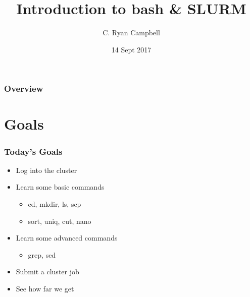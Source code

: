 \documentclass[14pt]{beamer}
\title[bash \& SLURM]{Introduction to bash \& SLURM} %
\author{C. Ryan Campbell} %
\institute[Duke] %
{
Duke University \\ %
\medskip
\textit{c.ryan.campbell@duke.edu} %
}
\date{14 Sept 2017} %
\begin{document}
\begin{frame}
\titlepage %
\end{frame}

\begin{frame}
\frametitle{Overview} %
\tableofcontents %
\end{frame}


\section{Goals} %

\begin{frame}
\frametitle{Today's Goals}
\begin{itemize}
	\item<+-> Log into the cluster
	\item<+-> Learn some basic commands
	\begin{itemize}
		\item<+-> cd, mkdir, ls, scp
		\item<+-> sort, uniq, cut, nano
	\end{itemize}
	\item<+-> Learn some advanced commands
	\begin{itemize}
		\item<+-> grep, sed
	\end{itemize}
	\item<+-> Submit a cluster job
	\item<+-> See how far we get
\end{itemize}
\end{frame}
\end{document}
